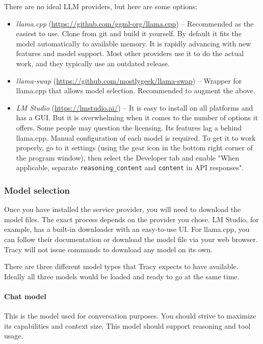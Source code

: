 \documentclass[hidelinks,titlepage,a4paper,twoside]{article}
\begin{document}
There are no ideal LLM providers, but here are some options:

\begin{itemize}
\item \emph{llama.cpp} (\url{https://github.com/ggml-org/llama.cpp}) -- Recommended as the easiest to use. Clone from git and build it yourself. By default it fits the model automatically to available memory. It is rapidly advancing with new features and model support. Most other providers use it to do the actual work, and they typically use an outdated release.
\item \emph{llama-swap} (\url{https://github.com/mostlygeek/llama-swap}) -- Wrapper for llama.cpp that allows model selection. Recommended to augment the above.
\item \emph{LM Studio} (\url{https://lmstudio.ai/}) -- It is easy to install on all platforms and has a GUI. But it is overwhelming when it comes to the number of options it offers. Some people may question the licensing. Its features lag a behind llama.cpp. Manual configuration of each model is required. To get it to work properly, go to it settings (using the gear icon in the bottom right corner of the program window), then select the Developer tab and enable "When applicable, separate \texttt{reasoning\_content} and \texttt{content} in API responses".
\end{itemize}

\subsubsection{Model selection}

Once you have installed the service provider, you will need to download the model files. The exact process depends on the provider you chose. LM Studio, for example, has a built-in downloader with an easy-to-use UI. For llama.cpp, you can follow their documentation or download the model file via your web browser. Tracy will not issue commands to download any model on its own.

There are three different model types that Tracy expects to have available. Ideally all three models would be loaded and ready to go at the same time.

\paragraph{Chat model}

This is the model used for conversation purposes. You should strive to maximize its capabilities and context size. This model should support reasoning and tool usage.
\end{document}
